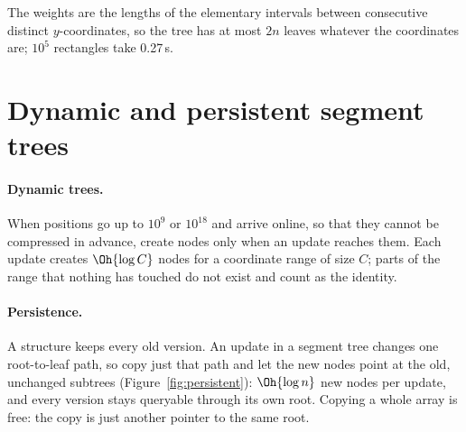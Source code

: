 
The weights are the lengths of the elementary intervals between consecutive distinct $y$-coordinates, so the tree has at most $2n$
leaves whatever the coordinates are; $10^5$ rectangles take 0.27\,s.

\section[Dynamic and persistent segment trees]{Dynamic and persistent segment trees \hfill \plat}\label{sec:persistent}

\paragraph{Dynamic trees.} When positions go up to $10^9$ or $10^{18}$ and arrive online, so that they cannot be compressed in
advance, create nodes only when an update reaches them. Each update creates $\Oh{\log C}$ nodes for a coordinate range of size $C$; parts
of the range that nothing has touched do not exist and count as the identity.


\paragraph{Persistence.} A  structure keeps every old version. An update in a segment tree changes one root-to-leaf
path, so copy just that path and let the new nodes point at the old, unchanged subtrees (Figure~\ref{fig:persistent}): $\Oh{\log n}$
new nodes per update, and every version stays queryable through its own root. Copying a whole array is free: the copy is just another
pointer to the same root.

